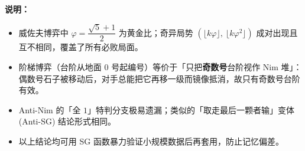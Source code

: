 \textbf{说明：}
\begin{itemize}
    \item 威佐夫博弈中 $\varphi=\dfrac{\sqrt5+1}{2}$ 为黄金比；奇异局势 $(\lfloor k\varphi\rfloor,\ \lfloor k\varphi^2\rfloor)$ 成对出现且互不相同，覆盖了所有必败局面。
    \item 阶梯博弈（台阶从地面 $0$ 号起编号）等价于「只把\textbf{奇数号}台阶视作 Nim 堆」：偶数号石子被移动后，对手总能把它再移一级而镜像抵消，故只有奇数号台阶有效。
    \item Anti-Nim 的「全 $1$」特判分支极易遗漏；类似的「取走最后一颗者输」变体 (Anti-SG) 结论形式相同。
    \item 以上结论均可用 SG 函数暴力验证小规模数据后再套用，防止记忆偏差。
\end{itemize}


